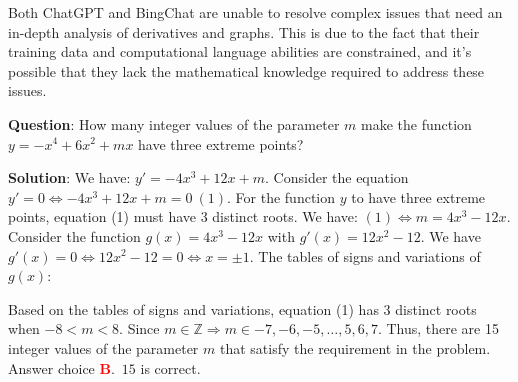 \documentclass{article}
\begin{document}
{	Both ChatGPT and BingChat are unable to resolve complex issues that need an in-depth analysis of derivatives and graphs. This is due to the fact that their training data and computational language abilities are constrained, and it's possible that they lack the mathematical knowledge required to address these issues.
	
	
	
	\begin{mdframed}[linewidth=1pt,linecolor=red]
		\textbf{Question}: How many integer values of the parameter $m$ make the function $y = -x^4 + 6x^2 + mx$ have three extreme points? 
		
		\begin{oneparchoices}
		\end{oneparchoices}
		
		\textbf{Solution}: We have: $y'=-4x^3+12x+m$. Consider the equation $y'=0 \Leftrightarrow -4x^3+12x+m=0~(1)$.
		For the function $y$ to have three extreme points, equation (1) must have 3 distinct roots. We have: $(1) \Leftrightarrow m=4x^3-12x$.
		Consider the function $g(x)=4x^3-12x$ with $g'(x)=12x^2-12$. We have $g'(x)=0 \Leftrightarrow 12x^2-12=0 \Leftrightarrow x=\pm 1$. The tables of signs and variations of $g(x)$:
\begin{center}
		\end{center}
		Based on the tables of signs and variations, equation (1) has 3 distinct roots when $-8<m<8$.
		Since $m \in \mathbb{Z} \Rightarrow m \in{-7,-6,-5, \ldots, 5,6,7}$.
		Thus, there are 15 integer values of the parameter $m$ that satisfy the requirement in the problem. Answer choice \textcolor{red}{\textbf{B}}.~$15$ is correct.
		

\end{mdframed}}
\end{document}

